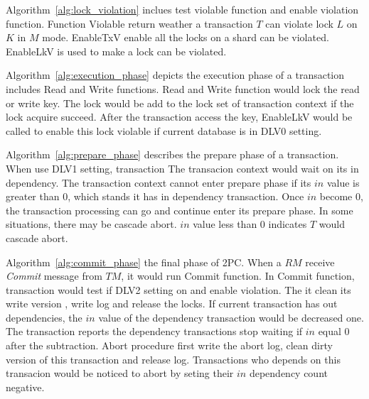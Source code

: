 \documentclass[conference]{IEEEtran}
\begin{document}
Algorithm~\ref{alg:lock_violation} inclues test violable function and enable violation function.
Function Violable return weather a transaction ${T}$ can violate lock ${L}$ on ${K}$ in ${M}$ mode.
EnableTxV enable all the locks on a shard can be violated.
EnableLkV is used to make a lock can be violated.

Algorithm~\ref{alg:execution_phase} depicts the execution phase of a transaction includes Read and Write functions.
Read and Write function would lock the read or write key.
The lock would be add to the lock set of transaction context
if the lock acquire succeed.
After the transaction access the key,
EnableLkV would be called to enable this lock violable if current database is in DLV0 setting. 

Algorithm~\ref{alg:prepare_phase} describes the prepare phase of a transaction.
When use DLV1 setting, 
transaction 
The transacion context would wait on its in dependency.
The transaction context cannot enter prepare phase if its ${in}$ value is greater than 0, which stands it has in dependency transaction.
Once ${in}$ become 0, the transaction processing can go and continue enter its prepare phase.
In some situations, there may be cascade abort.
${in}$ value less than 0 indicates ${T}$ would cascade abort. 


Algorithm~\ref{alg:commit_phase} the final phase of 2PC.
When a ${RM}$ receive \emph{Commit} message from ${TM}$, it would run Commit function.
In Commit function, transaction would test if DLV2 setting on and enable violation.
The it clean its write version , write log and release the locks.
If current transaction has out dependencies, the ${in}$ value of the dependency transaction would be decreased one.
The transaction reports the dependency transactions stop waiting  if $in$ equal 0 after the subtraction.  
Abort procedure first write the abort log, clean dirty version of this transaction and release log.
Transactions who depends on this transacion would be noticed to abort by seting their ${in}$ dependency count negative.
\end{document}
